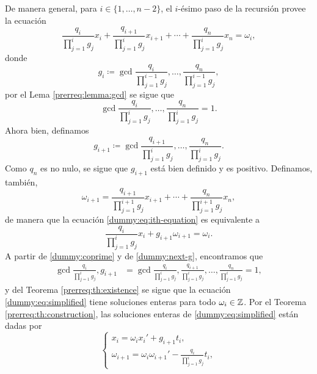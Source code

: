 De manera general, para $i \in \lbrace 1, \ldots, n - 2 \rbrace$, el $i$-ésimo paso de la recursión
provee la ecuación
\begin{equation}
	\label{dummy:eq:ith-equation}
	\frac{q_i}{\prod_{j=1}^{i}g_j}x_i
	+ \frac{q_{i+1}}{\prod_{j=1}^{i}g_j}x_{i+1}
	+ \cdots
	+ \frac{q_{n}}{\prod_{j=1}^{i}g_j}x_n
	= \omega_i,
\end{equation}
donde
\begin{equation*}
	g_i \coloneq \gcd{\frac{q_i}{\prod_{j=1}^{i-1}g_j}, \ldots, \frac{q_n}{\prod_{j=1}^{i-1}g_j}},
\end{equation*}
por el Lema \ref{prerreq:lemma:gcd} se sigue que
\begin{equation}
	\label{dummy:coprime}
	\gcd{\frac{q_i}{\prod_{j=1}^{i}g_j}, \ldots, \frac{q_n}{\prod_{j=1}^{i}g_j}} = 1.
\end{equation}
Ahora bien, definamos
\begin{equation}
	\label{dummy:next-g}
	g_{i + 1} \coloneq \gcd{
		\frac{q_{i+1}}{\prod_{j=1}^{i}g_j},
		\ldots,
		\frac{q_{n}}{\prod_{j=1}^{i}g_j}
	}.
\end{equation}
Como $q_n$ es no nulo, se sigue que $g_{i + 1}$ está bien definido y es positivo. Definamos,
también,
\begin{equation*}
	\omega_{i+1} =
	\frac{q_{i+1}}{\prod_{j=1}^{i + 1}g_j}x_{i+1}
	+ \cdots +
	\frac{q_{n}}{\prod_{j=1}^{i + 1}g_j}x_{n},
\end{equation*}
de manera que la ecuación \eqref{dummy:eq:ith-equation} es equivalente a
\begin{equation}
	\label{dummy:eq:simplified}
	\frac{q_i}{\prod_{j=1}^{i}g_j}x_i + g_{i+1}\omega_{i+1} = \omega_i.
\end{equation}
A partir de \eqref{dummy:coprime} y de \eqref{dummy:next-g}, encontramos que
\begin{align*}
	\gcd{
		\frac{q_i}{\prod_{j=1}^{i}g_j},
		g_{i+1}
	}
	&=
	\gcd{
		\frac{q_i}{\prod_{j=1}^{i}g_j},
		\frac{q_{i+1}}{\prod_{j=1}^{i}g_j},
		\ldots,
		\frac{q_n}{\prod_{j=1}^{i}g_j}
	} = 1,
\end{align*}
y del Teorema \ref{prerreq:th:existence} se sigue que la ecuación \eqref{dummy:eq:simplified}
tiene soluciones enteras para todo $\omega_i \in \mathbb{Z}$. Por el Teorema \ref{prerreq:th:construction},
las soluciones enteras de \eqref{dummy:eq:simplified} están dadas por
\begin{equation}
	\label{eq:recurrence}
	\begin{cases}
		x_i = \omega_ix_i' + g_{i + 1}t_i, \\
		\omega_{i + 1} = \omega_i\omega_{i + 1}' - \frac{q_i}{\prod_{j=1}^{i}g_j}t_i,
	\end{cases}
\end{equation}
